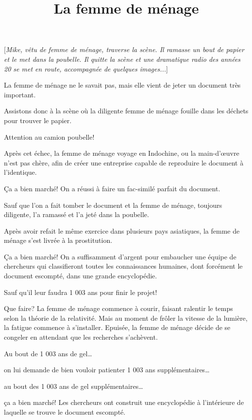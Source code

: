 \documentclass[a4paper]{article}
\title{La femme de ménage}
\date{}
\author{}
\begin{document}
\maketitle
\begin{center}

[\emph{Mike, vêtu de femme de ménage, traverse la scène. Il ramasse un bout de
papier et le met dans la poubelle. Il quitte la scène et une dramatique
radio des années 20 se met en route, accompagnée de quelques images...}]
\end{center}
La femme de ménage ne le savait pas, mais elle vient de jeter un document
très important.

Assistons donc à la scène où la diligente femme de ménage fouille dans les
déchets pour trouver le papier.

Attention au camion poubelle!

Après cet échec, la femme de ménage voyage en Indochine, ou la main-d’œuvre
n’est pas chère, afin de créer une entreprise capable de reproduire le document
à l’identique.

Ça a bien marché! On a réussi à faire un fac-similé parfait du document.

Sauf que l'on a fait tomber le document et la femme de ménage, toujours
diligente, l’a ramassé et l’a jeté dans la poubelle.

Après avoir refait le même exercice dans plusieurs pays asiatiques, la femme
de ménage s’est livrée à la prostitution.

Ça a bien marché! On a suffisamment d’argent pour embaucher une équipe de chercheurs qui
classifieront toutes les connaissances humaines, dont forcément le document
escompté, dans une grande encyclopédie.

Sauf qu’il leur faudra 1 003 ans pour finir le projet!

Que faire? La femme de ménage
commence à courir, faisant ralentir le temps selon la théorie
de la relativité. Mais au moment de frôler la vitesse de la lumière, la fatigue
commence à s'installer. Epuisée, la femme de ménage décide de se congeler en
attendant que les recherches s'achèvent.

Au bout de 1 003 ans de gel…

on lui demande de bien vouloir patienter 1 003 ans supplémentaires…

au bout des 1 003 ans de gel supplémentaires…

ça a bien marché! Les chercheurs ont construit une encyclopédie à
l'intérieure de laquelle se trouve le document escompté.
\end{document}
